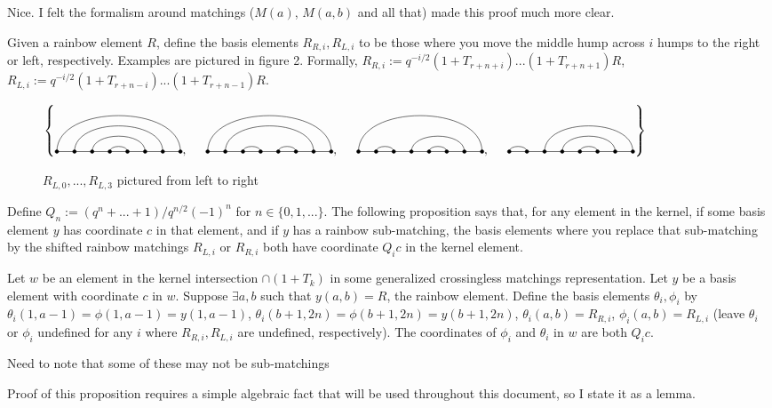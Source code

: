 \documentclass{amsart}
\begin{document}
{\color{magenta} Nice. I felt the formalism around matchings ($M(a)$, $M(a,b)$ and all that) made this proof much more clear.}

Given a rainbow element $R$, define the basis elements $R_{R,i},R_{L,i}$ to be those where you move the middle hump across $i$ humps to the right or left, respectively. Examples are pictured in figure 2. Formally, $R_{R,i}:=q^{-i/2}(1+T_{r+n+i})...(1+T_{r+n+1})R$, $R_{L,i}:=q^{-i/2}(1+T_{r+n-i})...(1+T_{r+n-1})R$.

\begin{figure}
		\def\cbasisspacing{5mm}
	$\cbr{
		\begin{gathered}
		\Matching{8}{1/8, 2/7, 3/6, 4/5}, \hspace{\cbasisspacing}
		\Matching{8}{1/8, 2/7, 3/4, 5/6}, \hspace{\cbasisspacing}
		\Matching{8}{1/8, 2/3, 4/7, 5/6}, \hspace{\cbasisspacing}
		\Matching{8}{1/2,3/8,4/7,5/6}
		\end{gathered}}$
	\caption{$R_{L,0},...,R_{L,3}$ pictured from left to right}
\end{figure}

 Define $Q_n:=(q^n+...+1)/q^{n/2}(-1)^n$ for $n\in \{0,1,...\}$. The following proposition says that, for any element in the kernel, if some basis element $y$ has coordinate $c$ in that element, and if $y$ has a rainbow sub-matching, the basis elements where you replace that sub-matching by the shifted rainbow matchings $R_{L,i}$ or $R_{R,i}$ both have coordinate $Q_ic$ in the kernel element.
 
\begin{proposition}
	Let $w$ be an element in the kernel intersection $\cap (1+T_k)$ in some generalized crossingless matchings representation. Let $y$ be a basis element with coordinate $c$ in $w$. Suppose $\exists a,b$ such that $y(a,b)=R$, the rainbow element. Define the basis elements $\theta_i,\phi_i$ by $\theta_i(1,a-1)=\phi(1,a-1)=y(1,a-1)$, $\theta_i(b+1,2n)=\phi(b+1,2n)=y(b+1,2n)$, $\theta_i(a,b)=R_{R,i}$, $\phi_i(a,b)=R_{L,i}$ (leave $\theta_i$ or $\phi_i$ undefined for any $i$ where $R_{R,i},R_{L,i}$ are undefined, respectively). The coordinates of $\phi_i$ and $\theta_i$ in $w$ are both $Q_ic$.
\end{proposition}
{\color{red} Need to note that some of these may not be sub-matchings}

Proof of this proposition requires a simple algebraic fact that will be used throughout this document, so I state it as a lemma.
\end{document}

